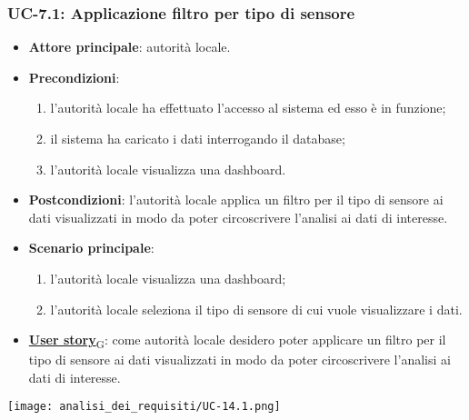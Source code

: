 \subsubsection{UC-7.1: Applicazione filtro per tipo di sensore}
\begin{itemize}
	\item \textbf{Attore principale}: autorità locale.
	\item \textbf{Precondizioni}:
	      \begin{enumerate}
		      \item l'autorità locale ha effettuato l'accesso al sistema ed esso è in funzione;
		      \item il sistema ha caricato i dati interrogando il database;
		      \item l'autorità locale visualizza una dashboard.
	      \end{enumerate}
	\item \textbf{Postcondizioni}: l'autorità locale applica un filtro per il tipo di sensore ai dati visualizzati in modo da poter circoscrivere l'analisi ai dati di interesse.
	\item \textbf{Scenario principale}:
	      \begin{enumerate}
		      \item l'autorità locale visualizza una dashboard;
		      \item l'autorità locale seleziona il tipo di sensore di cui vuole visualizzare i dati.
	      \end{enumerate}
	\item \href{https://7last.github.io/docs/rtb/documentazione-interna/glossario\#user-story}{\textbf{User story}\textsubscript{G}}:
	      come autorità locale desidero poter applicare un filtro per il tipo di sensore ai dati visualizzati in modo da poter circoscrivere l'analisi ai dati di interesse.
\end{itemize}
\begin{center}
	\texttt{[image: analisi\_dei\_requisiti/UC-14.1.png]}
\end{center}

